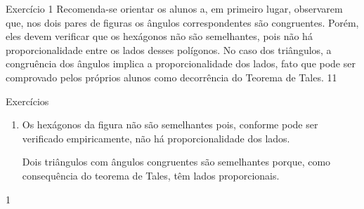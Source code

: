 \def\currentcolor{cor1}
\begin{sugestions}{Exercício 1}
{
Recomenda-se orientar os alunos a, em primeiro lugar, observarem que, nos dois pares de figuras os ângulos correspondentes são congruentes. Porém, eles devem verificar que os hexágonos não são semelhantes, pois não há proporcionalidade entre os lados desses polígonos.  No caso dos triângulos, a congruência dos ângulos implica a proporcionalidade dos lados, fato que pode ser comprovado pelos próprios alunos como decorrência do Teorema de Tales.  
}{1}{1}
\end{sugestions}
\begin{answer}{Exercícios}
{\exerciselist
\begin{enumerate}
\item Os hexágonos da figura não são semelhantes pois, conforme pode ser verificado empiricamente, não há proporcionalidade dos lados.

Dois triângulos com ângulos congruentes são semelhantes porque, como consequência do teorema de Tales, têm lados proporcionais.
\end{enumerate}
}{1}
\end{answer}

\exercise
{}\label{transformacoes-exercise5}

